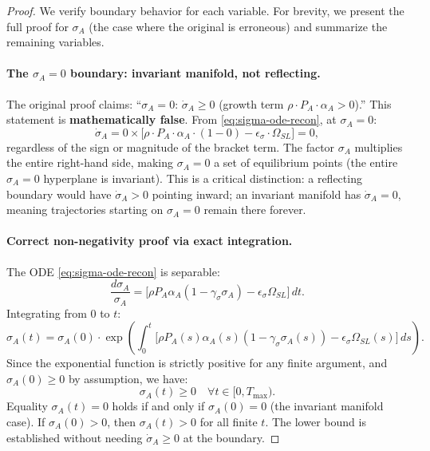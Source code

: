 \begin{proof}
We verify boundary behavior for each variable. For brevity, we present
the full proof for $\sigma_A$ (the case where the original is erroneous)
and summarize the remaining variables.

\paragraph{The $\sigma_A = 0$ boundary: invariant manifold, not reflecting.}
The original proof claims: ``$\sigma_A = 0$: $\dot{\sigma}_A \geq 0$
(growth term $\rho \cdot P_A \cdot \alpha_A > 0$).'' This statement is
\textbf{mathematically false}. From \eqref{eq:sigma-ode-recon}, at $\sigma_A = 0$:
\[
\dot{\sigma}_A = 0 \times \bigl[ \rho \cdot P_A \cdot \alpha_A \cdot (1 - 0) - \epsilon_\sigma \cdot \Omega_{SL} \bigr] = 0,
\]
regardless of the sign or magnitude of the bracket term. The factor
$\sigma_A$ multiplies the entire right-hand side, making $\sigma_A = 0$
a set of equilibrium points (the entire $\sigma_A = 0$ hyperplane is
invariant). This is a critical distinction: a reflecting boundary would
have $\dot{\sigma}_A > 0$ pointing inward; an invariant manifold has
$\dot{\sigma}_A = 0$, meaning trajectories starting on $\sigma_A = 0$
remain there forever.

\paragraph{Correct non-negativity proof via exact integration.}
The ODE \eqref{eq:sigma-ode-recon} is separable:
\[
\frac{d\sigma_A}{\sigma_A} = \bigl[ \rho P_A \alpha_A (1 - \gamma_\sigma \sigma_A) - \epsilon_\sigma \Omega_{SL} \bigr] \, dt.
\]
Integrating from $0$ to $t$:
\begin{equation}\label{eq:exact-integral}
\sigma_A(t) = \sigma_A(0) \cdot
\exp\!\left( \int_0^t \bigl[ \rho P_A(s) \alpha_A(s) (1 - \gamma_\sigma \sigma_A(s))
- \epsilon_\sigma \Omega_{SL}(s) \bigr] \, ds \right).
\end{equation}
Since the exponential function is strictly positive for any finite
argument, and $\sigma_A(0) \geq 0$ by assumption, we have:
\[
\sigma_A(t) \geq 0 \quad \forall t \in [0, T_{\max}).
\]
Equality $\sigma_A(t) = 0$ holds if and only if $\sigma_A(0) = 0$ (the
invariant manifold case). If $\sigma_A(0) > 0$, then $\sigma_A(t) > 0$
for all finite $t$. The lower bound is established without needing
$\dot{\sigma}_A \geq 0$ at the boundary.


\end{proof}
